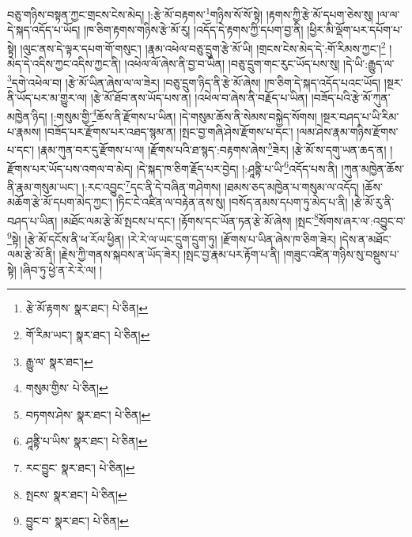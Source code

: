 བཅུ་གཉིས་བསྟན་ཀྱང་གྲངས་ངེས་མེད། །:རྩེ་མོ་བརྟགས་\footnote{རྩེ་མོ་རྟགས་  སྣར་ཐང་།  པེ་ཅིན། }གཉིས་སོ་སོ་སྟེ། །རྟགས་ཀྱི་རྩེ་མོ་དཔག་ཅེས་སུ། །ལ་ལ་དེ་སྐད་འདོད་པ་ཡོད། །ཁ་ཅིག་རྟགས་གཉིས་རྩེ་མོ་རུ། །འདོད་དེ་རྟགས་ཀྱི་དཔག་བྱ་ནི། །ཕྱིར་མི་ལྡོག་པར་དཔོག་པ་སྟེ། །ལུང་ནས་དེ་ལྟར་དཔག་གོ་གསུང་། །རྣམ་འཕེལ་བཅུ་དྲུག་རྩེ་མོ་ཡི། །གྲངས་ངེས་མེད་དེ་:གོ་རིམས་ཀྱང་།\footnote{གོ་རིམ་ཡང་།  སྣར་ཐང་།  པེ་ཅིན། } །མེད་དེ་འདིས་ཀྱང་འདིས་ཀྱང་ནི། །འཕེལ་ལོ་ཞེས་ནི་བྱ་བ་ཡིན། །བཅུ་དྲུག་གང་རུང་ཡོད་པས་སུ། །དེ་ཡི་:རྒྱུད་ལ་\footnote{རྒྱུ་ལ་  སྣར་ཐང་། }དགེ་འཕེལ་བ། །རྩེ་མོ་ཡིན་ཞེས་ལ་ལ་ཟེར། །བཅུ་དྲུག་ཉིད་ནི་རྩེ་མོ་ཞེས། །ཁ་ཅིག་དེ་སྐད་འདོད་པའང་ཡོད། །སྔར་ནི་ཡོད་པར་མ་གྱུར་ལ། །རྩེ་མོ་ཐོབ་ནས་ཡོད་པས་ན། །འཕེལ་བ་ཞེས་ནི་བརྗོད་པ་ཡིན། །བཟོད་པའི་རྩེ་མོ་ཀུན་མཁྱེན་ཉིད། །:གསུམ་གྱི་\footnote{གསུམ་གྱིས་  པེ་ཅིན། }ཆོས་ནི་རྫོགས་པ་ཡིན། །དེ་གསུམ་ཆོས་ནི་སེམས་བསྐྱེད་སོགས། །སྔར་བཤད་པ་ཡི་རིམ་པ་རྣམས། །བཟོད་པར་རྫོགས་པར་འཐད་སྙམ་ན། །སྤང་བྱ་གཞི་ཤེས་རྫོགས་པ་དང་། །ལམ་ཤེས་རྣམ་གཉིས་རྫོགས་པ་དང་། །རྣམ་ཀུན་བར་དུ་རྫོགས་པ་ལ། །རྫོགས་པའི་ཐ་སྙད་:བརྟགས་ཞེས་\footnote{བཏགས་ཤེས་  སྣར་ཐང་།  པེ་ཅིན། }ཟེར། །རྩེ་མོ་ས་དགུ་ཡན་ཆད་ན། །རྫོགས་པར་ཡོད་པས་འགལ་བ་མེད། །དེ་སྐད་ཁ་ཅིག་རྗོད་པར་བྱེད། །:ཤཱནྟི་པ་ཡི་\footnote{ཤཱནྟི་པ་ཡིས་  སྣར་ཐང་།  པེ་ཅིན། }འདོད་པས་ནི། །ཀུན་མཁྱེན་ཆོས་ནི་རྣམ་གསུམ་ཡང་། །:རང་འབྱུང་\footnote{རང་བྱུང་  སྣར་ཐང་།  པེ་ཅིན། }དང་ནི་དེ་བཞིན་གཤེགས། །ཐམས་ཅད་མཁྱེན་པ་གསུམ་ལ་འདོད། །ཆོས་མཆོག་རྩེ་མོ་དཔག་མེད་ཀྱང་། །ཏིང་ངེ་འཛིན་ལ་བརྟེན་ནས་སུ། །བསོད་ནམས་དཔག་ཏུ་མེད་པ་ནི། །རྩེ་མོ་རུ་ནི་བཤད་པ་ཡིན། །མཐོང་ལམ་རྩེ་མོ་སྤངས་པ་དང་། །རྟོགས་དང་ཡོན་ཏན་རྩེ་མོ་ཞེས། །སྤང་\footnote{སྤངས་  སྣར་ཐང་།  པེ་ཅིན། }སོགས་ཞར་ལ་:འབྱུང་བ་\footnote{བྱུང་བ་  སྣར་ཐང་།  པེ་ཅིན། }སྟེ། །རྩེ་མོ་དངོས་ནི་ཕ་རོལ་ཕྱིན། །རེ་རེ་ལ་ཡང་དྲུག་དྲུག་ཏུ། །རྫོགས་པ་ཡིན་ཞེས་ཁ་ཅིག་ཟེར། །དེས་ན་མཐོང་ལམ་རྩེ་མོ་ནི། །རྗེས་ཀྱི་གནས་སྐབས་ན་ཡོད་ཟེར། །སྤང་བྱ་རྣམ་པར་རྟོག་པ་ནི། །གཟུང་འཛིན་གཉིས་སུ་བསྡུས་པ་སྟེ། །ཞིབ་ཏུ་ཕྱེ་ན་རེ་རེ་ལ། །
